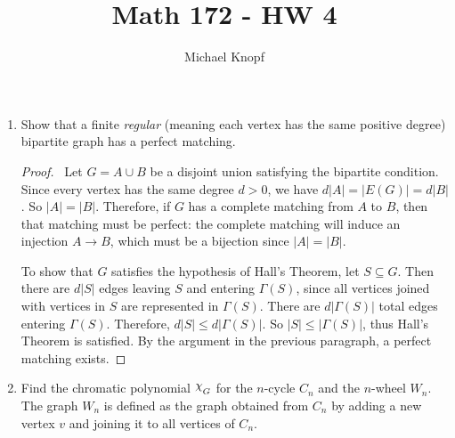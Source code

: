 \documentclass[12pt]{article}
\begin{document}
 


\title{Math 172 - HW 4}
\author{Michael Knopf}
 
\maketitle


\begin{enumerate}[leftmargin=0cm,itemindent=.5cm,labelwidth=\itemindent,labelsep=0cm,align=left]

\item Show that a finite \emph{regular} (meaning each vertex has the same positive degree) bipartite graph has a perfect matching.

\begin{proof}

\ Let $G = A \cup B$ be a disjoint union satisfying the bipartite condition.  Since every vertex has the same degree $d > 0$, we have $d|A| = |E(G)| = d|B|$.  So $|A| = |B|$.  Therefore, if $G$ has a complete matching from $A$ to $B$, then that matching must be perfect: the complete matching will induce an injection $A \rightarrow B$, which must be a bijection since $|A| = |B|$.

To show that $G$ satisfies the hypothesis of Hall's Theorem, let $S \subseteq G$.  Then there are $d|S|$ edges leaving $S$ and entering $\Gamma(S)$, since all vertices joined with vertices in $S$ are represented in $\Gamma(S)$.  There are $d|\Gamma(S)|$ total edges entering $\Gamma(S)$.  Therefore, $d|S| \leq d|\Gamma(S)|$.  So $|S| \leq |\Gamma(S)|$, thus Hall's Theorem is satisfied.  By the argument in the previous paragraph, a perfect matching exists.

\end{proof}

\item Find the chromatic polynomial $\raisebox{3pt}{$\chi$}_G$ for the $n$-cycle $C_n$ and the $n$-wheel $W_n$.  The graph $W_n$ is defined as the graph obtained from $C_n$ by adding a new vertex $v$ and joining it to all vertices of $C_n$.

\begin{figure}[h!]
\begin{center}
\end{center}
\end{figure}
\end{enumerate}
\end{document}
